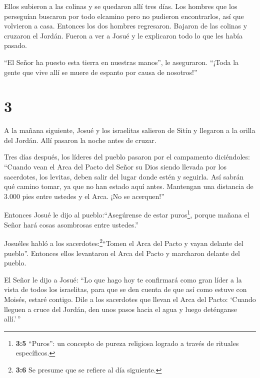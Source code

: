 Ellos subieron a las colinas y se quedaron allí tres días.
Los hombres que los perseguían buscaron por todo elcamino pero no
pudieron encontrarlos, así que volvieron a casa.  Entonces
los dos hombres regresaron. Bajaron de las colinas y cruzaron el Jordán.
Fueron a ver a Josué y le explicaron todo lo que les había pasado.

 ``El Señor ha puesto esta tierra en nuestras manos'', le
aseguraron. ``¡Toda la gente que vive allí se muere de espanto por causa
de nosotros!''

\hypertarget{section-2}{%
\section{3}\label{section-2}}

 A la mañana siguiente, Josué y los israelitas salieron de
Sitín y llegaron a la orilla del Jordán. Allí pasaron la noche antes de
cruzar.

 Tres días después, los líderes del pueblo pasaron por el
campamento  diciéndoles: ``Cuando vean el Arca del Pacto del
Señor su Dios siendo llevada por los sacerdotes, los levitas, deben
salir del lugar donde estén y seguirla.  Así sabrán qué
camino tomar, ya que no han estado aquí antes. Mantengan una distancia
de 3.000 pies entre ustedes y el Arca. ¡No se acerquen!''

 Entonces Josué le dijo al pueblo:``Asegúrense de estar
puros\footnote{\textbf{3:5} ``Puros'': un concepto de pureza religiosa
  logrado a través de rituales específicos.}, porque mañana el Señor
hará cosas asombrosas entre ustedes.''

 Josuéles habló a los sacerdotes:\footnote{\textbf{3:6} Se
  presume que se refiere al día siguiente.}``Tomen el Arca del Pacto y
vayan delante del pueblo''. Entonces ellos levantaron el Arca del Pacto
y marcharon delante del pueblo.

 El Señor le dijo a Josué: ``Lo que hago hoy te confirmará
como gran líder a la vista de todos los israelitas, para que se den
cuenta de que así como estuve con Moisés, estaré contigo. 
Dile a los sacerdotes que llevan el Arca del Pacto: `Cuando lleguen a
cruce del Jordán, den unos pasos hacia el agua y luego deténganse
allí.'\,''


